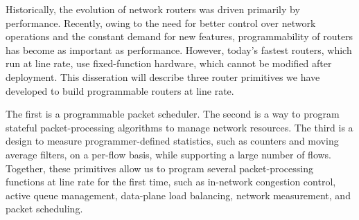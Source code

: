 % 
% 
%
Historically, the evolution of network routers was driven primarily by
performance. Recently, owing to the need for better control over network
operations and the constant demand for new features, programmability of routers
has become as important as performance.  However, today's fastest routers,
which run at line rate, use fixed-function hardware, which cannot be modified
after deployment. This disseration will describe three router primitives we
have developed to build programmable routers at line rate.

The first is a programmable packet scheduler. The second is a way to program
stateful packet-processing algorithms to manage network resources. The third is
a design to measure programmer-defined statistics, such as counters and moving
average filters, on a per-flow basis, while supporting a large number of flows.
Together, these primitives allow us to program several packet-processing
functions at line rate for the first time, such as in-network congestion
control, active queue management, data-plane load balancing, network
measurement, and packet scheduling.
